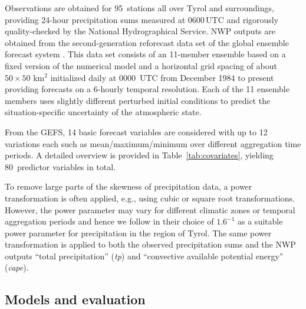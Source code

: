 \documentclass[aoas, preprint]{imsart}
\numberwithin{equation}{subsection}
\begin{document}
Observations are obtained for 95~stations all over Tyrol and surroundings,
providing 24-hour precipitation sums measured at 0600\,UTC and rigorously
quality-checked by the National Hydrographical Service. NWP outputs
are obtained from the second-generation reforecast data set of the
global ensemble forecast system \citep[GEFS,][]{Hamill+Bates+Whitaker:2013}. 
This data set consists of an 11-member ensemble based on a fixed version of the 
numerical model and a horizontal grid spacing of about {$50 \times 50$ km$^2$}
initialized daily at 0000~UTC from December 1984 to present 
providing forecasts on a 6-hourly temporal resolution. Each of the 
11 ensemble members uses slightly different perturbed initial 
conditions to predict the situation-specific uncertainty 
of the atmospheric state. 

From the GEFS, 14 basic forecast variables are considered with up 
to 12 variations each such as mean/maximum/minimum
over different aggregation time periods. A detailed overview is
provided in Table~\ref{tab:covariates}, yielding 80~predictor variables in total.

To remove large parts of the skewness of precipitation data, 
a power transformation \citep{Box+Cox:1964} is often applied, e.g., using
cubic \citep{Stidd:1973} or square root \citep{Hutchinson:1998} transformations.
However, the power parameter may vary for different climatic zones or temporal 
aggregation periods and hence we follow \cite{Stauffer+Mayr+Messner:2017} 
in their choice of $1.6^{-1}$ as a suitable power parameter for precipitation
in the region of Tyrol. The same power transformation is applied to both the
observed precipitation sums and the NWP outputs ``total precipitation'' (\emph{tp}) and
``convective available potential energy'' (\emph{cape}).


\subsection{Models and evaluation}
\label{sec:evaluation}
\end{document}
